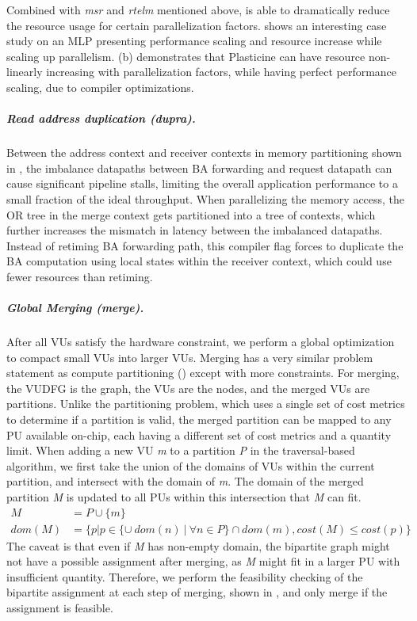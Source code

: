 Combined with \emph{msr} and \emph{rtelm} mentioned above, \name is able to 
dramatically reduce the resource usage for certain parallelization factors.
 shows an interesting case study on an MLP presenting performance scaling and resource
increase while scaling up parallelism.
 (b) demonstrates that Plasticine can have resource
non-linearly increasing with parallelization factors, while having perfect performance scaling, due to compiler optimizations.

\subparagraph{Read address duplication (dupra).} 
Between the address context and receiver contexts in memory partitioning shown in 
,
the imbalance datapaths between BA forwarding and request datapath can cause significant pipeline
stalls, limiting the overall application performance to a small fraction of the ideal throughput.
When parallelizing the memory access, the OR tree in the merge context gets partitioned into a tree
of contexts, which further increases the mismatch in latency between the imbalanced datapaths.
Instead of retiming BA forwarding path, 
this compiler flag forces \name to duplicate the BA computation using local states
within the receiver context, which could use fewer resources than retiming.

\subparagraph{Global Merging (merge).}
After all VUs satisfy the hardware constraint, we perform a global optimization to compact small VUs into larger VUs. 
Merging has a very similar problem statement as compute partitioning () except with more constraints.
For merging, the VUDFG is the graph, the VUs are the nodes, and the merged VUs are partitions.
Unlike the partitioning problem, which uses a single set of cost metrics to determine if a partition
is valid, the merged partition
can be mapped to any PU available on-chip, each having a different set of cost metrics and a
quantity limit.
When adding a new VU \emph{m} to a partition \emph{P} in the traversal-based algorithm, 
we first take the union of the domains of VUs within the current partition, and
intersect with the domain of \emph{m}.
The domain of the merged partition \emph{M} is updated to all PUs within this intersection that \emph{M} can fit.
\begin{align}
  M &= P \cup \{m\} \\
  dom(M) &= \{ p | p \in \{\cup\ dom(n)\ |\ \forall n \in P\} \cap dom(m), cost(M) \leq cost(p) \}
\end{align}
The caveat is that even if \emph{M} has non-empty domain, the bipartite graph might not have a possible 
assignment after merging, as \emph{M} might fit in a larger PU with insufficient quantity.
Therefore, we perform the feasibility checking of the bipartite assignment at each step
of merging, shown in , and only merge if the assignment is feasible.

